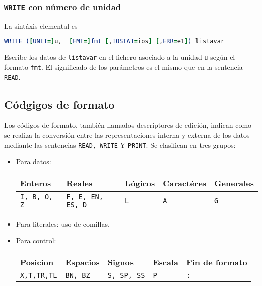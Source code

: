 \subsubsection{\texttt{WRITE} con número de unidad}


La sintáxis elemental es 

\begin{lstlisting}[language=Fortran]
	WRITE ([UNIT=]u,  [FMT=]fmt [,IOSTAT=ios] [,ERR=e1]) listavar
\end{lstlisting}
Escribe los datos de {\tt listavar} en el fichero asociado a la unidad {\tt u} según el formato {\tt fmt}. El significado de los parámetros es el mismo que en la sentencia {\tt READ}.


\subsection{Códgigos de formato}

Los códigos de formato, también llamados descriptores de edición, indican como se realiza la conversión entre las representaciones interna y externa de los datos mediante las sentencias {\tt READ, WRITE} Y {\tt PRINT}. Se clasifican en tres grupos:

\begin{itemize}
	\item Para datos:
	\begin{table}[h!] \centering
	\begin{tabular}{|l|l|l|l|l|}
		\hline
		Enteros & Reales & Lógicos & Caractéres & Generales \\ \hline
		\texttt{I, B, O, Z} & \texttt{F, E, EN, ES, D} &  \texttt{L} & \texttt{A} & \texttt{G} \\ \hline
	\end{tabular}
	\end{table}
	\item Para literales: uso de comillas.
	\item Para control:
	\begin{table}[h!] \centering
	\begin{tabular}{|l|l|l|l|l|}
		\hline
		Posicion & Espacios & Signos & Escala & Fin de formato \\ \hline
		\texttt{X,T,TR,TL} & \texttt{BN, BZ} &  \texttt{S, SP, SS} & \texttt{P} & \texttt{:} \\ \hline
	\end{tabular}
	\end{table}
\end{itemize}

